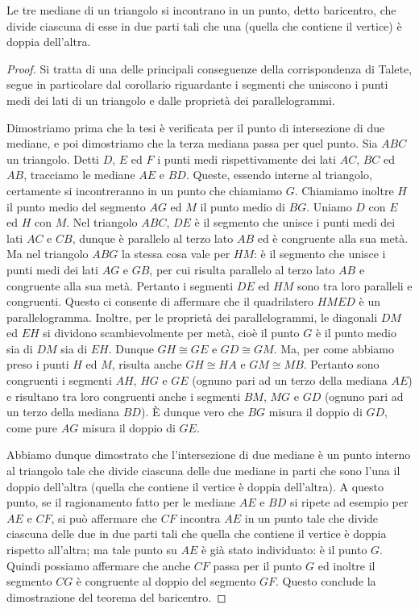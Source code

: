 \begin{teorema}
Le tre mediane di un triangolo si incontrano in un punto, detto baricentro, che divide ciascuna di esse in due parti tali che una (quella che contiene il vertice) è doppia dell'altra.
\end{teorema}

\begin{proof}
Si tratta di una delle principali conseguenze della corrispondenza di Talete, segue in particolare dal corollario riguardante i segmenti che uniscono i punti medi dei lati di un triangolo e dalle proprietà dei parallelogrammi.

Dimostriamo prima che la tesi è verificata per il punto di intersezione di due mediane, e poi dimostriamo che la terza mediana passa per quel punto.
Sia $ABC$ un triangolo. Detti $D$, $E$ ed $F$ i punti medi rispettivamente dei lati $AC$, $BC$ ed $AB$, tracciamo le mediane $AE$ e $BD$. Queste, essendo interne al triangolo, certamente si incontreranno in un punto che chiamiamo $G$. Chiamiamo inoltre $H$ il punto medio del segmento $AG$ ed $M$ il punto medio di $BG$. Uniamo $D$ con $E$ ed $H$ con $M$. Nel triangolo $ABC$, $DE$ è il segmento che unisce i punti medi dei lati $AC$ e $CB$, dunque è parallelo al terzo lato $AB$ ed è congruente alla sua metà. Ma nel triangolo $ABG$ la stessa cosa vale per $HM$: è il segmento che unisce i punti medi dei lati $AG$ e $GB$, per cui risulta parallelo al terzo lato $AB$ e congruente alla sua metà. Pertanto i segmenti $DE$ ed $HM$ sono tra loro paralleli e congruenti. Questo ci consente di affermare che il quadrilatero $HMED$ è un parallelogramma. Inoltre, per le proprietà dei parallelogrammi, le diagonali $DM$ ed $EH$ si dividono scambievolmente per metà, cioè il punto $G$ è il punto medio sia di $DM$ sia di $EH$. Dunque $GH\cong GE$ e $GD\cong GM$. Ma, per come abbiamo preso i punti $H$ ed $M$, risulta anche $GH\cong HA$ e $GM\cong MB$. Pertanto sono congruenti i segmenti $AH$, $HG$ e $GE$ (ognuno pari ad un terzo della mediana $AE$) e risultano tra loro congruenti anche i segmenti $BM$, $MG$ e $GD$ (ognuno pari ad un terzo della mediana $BD$). \`E dunque vero che $BG$ misura il doppio di $GD$, come pure $AG$ misura il doppio di $GE$.

Abbiamo dunque dimostrato che l'intersezione di due mediane è un punto interno al triangolo tale che divide ciascuna delle due mediane in parti che sono l'una il doppio dell'altra (quella che contiene il vertice è doppia dell'altra).
A questo punto, se il ragionamento fatto per le mediane $AE$ e $BD$ si ripete ad esempio per $AE$ e $CF$, si può affermare che $CF$ incontra $AE$ in un punto tale che divide ciascuna delle due in due parti tali che quella che contiene il vertice è doppia rispetto all'altra; ma tale punto su $AE$ è già stato individuato: è il punto $G$. Quindi possiamo affermare che anche $CF$ passa per il punto $G$ ed inoltre il segmento $CG$ è congruente al doppio del segmento $GF$. Questo conclude la dimostrazione del teorema del baricentro.
\end{proof}

